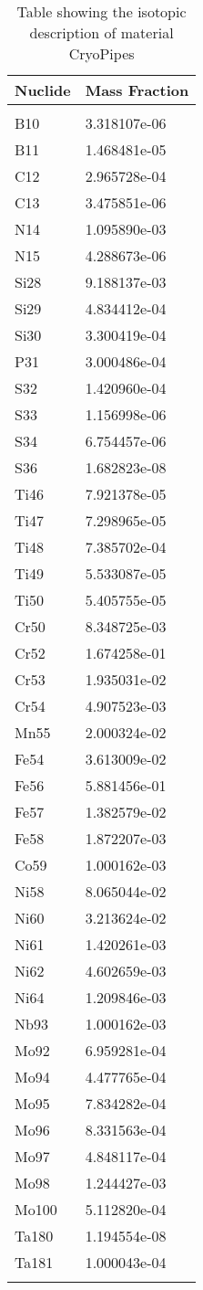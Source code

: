 \begin{centering}
\begin{longtable}[ht!]
{ p{} | p{} }
\hline
Nuclide & Mass Fraction\\
\hline
\\
B10 & 3.318107e-06\\
B11 & 1.468481e-05\\
C12 & 2.965728e-04\\
C13 & 3.475851e-06\\
N14 & 1.095890e-03\\
N15 & 4.288673e-06\\
Si28 & 9.188137e-03\\
Si29 & 4.834412e-04\\
Si30 & 3.300419e-04\\
P31 & 3.000486e-04\\
S32 & 1.420960e-04\\
S33 & 1.156998e-06\\
S34 & 6.754457e-06\\
S36 & 1.682823e-08\\
Ti46 & 7.921378e-05\\
Ti47 & 7.298965e-05\\
Ti48 & 7.385702e-04\\
Ti49 & 5.533087e-05\\
Ti50 & 5.405755e-05\\
Cr50 & 8.348725e-03\\
Cr52 & 1.674258e-01\\
Cr53 & 1.935031e-02\\
Cr54 & 4.907523e-03\\
Mn55 & 2.000324e-02\\
Fe54 & 3.613009e-02\\
Fe56 & 5.881456e-01\\
Fe57 & 1.382579e-02\\
Fe58 & 1.872207e-03\\
Co59 & 1.000162e-03\\
Ni58 & 8.065044e-02\\
Ni60 & 3.213624e-02\\
Ni61 & 1.420261e-03\\
Ni62 & 4.602659e-03\\
Ni64 & 1.209846e-03\\
Nb93 & 1.000162e-03\\
Mo92 & 6.959281e-04\\
Mo94 & 4.477765e-04\\
Mo95 & 7.834282e-04\\
Mo96 & 8.331563e-04\\
Mo97 & 4.848117e-04\\
Mo98 & 1.244427e-03\\
Mo100 & 5.112820e-04\\
Ta180 & 1.194554e-08\\
Ta181 & 1.000043e-04\\
\caption{Table showing the isotopic description of material CryoPipes}
\label{table:material_CryoPipes}
\end{longtable}\clearpage


\end{centering}
